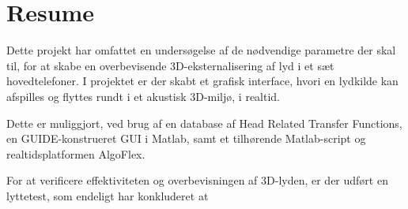 \chapter*{Resume}

Dette projekt har omfattet en undersøgelse af de nødvendige parametre der skal til, for at skabe en overbevisende 3D-eksternalisering af lyd i et sæt hovedtelefoner. I projektet er der skabt et grafisk interface, hvori en lydkilde kan afspilles og flyttes rundt i et akustisk 3D-miljø, i realtid. 

Dette er muliggjort, ved brug af en database af Head Related Transfer Functions, en GUIDE-konstrueret GUI i Matlab, samt et tilhørende Matlab-script og realtidsplatformen AlgoFlex. 

For at verificere effektiviteten og overbevisningen af 3D-lyden, er der udført en lyttetest, som endeligt har konkluderet at 

